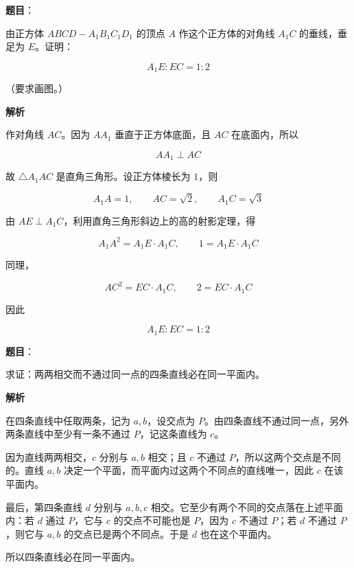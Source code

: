 \begin{answer}

\textbf{题目}：

由正方体 $ABCD-A_1B_1C_1D_1$ 的顶点 $A$ 作这个正方体的对角线 $A_1C$ 的垂线，垂足为 $E$。证明：

\nopagebreak[4]
\[
A_1E:EC=1:2
\]

（要求画图。）

\textbf{解析}
\nopagebreak[4]
\begin{center}\end{center}
\nopagebreak[4]
作对角线 $AC$。因为 $AA_1$ 垂直于正方体底面，且 $AC$ 在底面内，所以

\nopagebreak[4]
\[
AA_1\perp AC
\]

故 $\triangle A_1AC$ 是直角三角形。设正方体棱长为 $1$，则

\nopagebreak[4]
\[
A_1A=1,
\qquad AC=\sqrt2,
\qquad A_1C=\sqrt3
\]

由 $AE\perp A_1C$，利用直角三角形斜边上的高的射影定理，得

\nopagebreak[4]
\[
A_1A^2=A_1E\cdot A_1C,
\qquad 1=A_1E\cdot A_1C
\]

同理，

\nopagebreak[4]
\[
AC^2=EC\cdot A_1C,
\qquad 2=EC\cdot A_1C
\]

因此

\nopagebreak[4]
\[
A_1E:EC=1:2
\]


\end{answer}
\begin{answer}

\textbf{题目}：

求证：两两相交而不通过同一点的四条直线必在同一平面内。

\textbf{解析}

在四条直线中任取两条，记为 $a,b$，设交点为 $P$。由四条直线不通过同一点，另外两条直线中至少有一条不通过 $P$，记这条直线为 $c$。

因为直线两两相交，$c$ 分别与 $a,b$ 相交；且 $c$ 不通过 $P$，所以这两个交点是不同的。直线 $a,b$ 决定一个平面，而平面内过这两个不同点的直线唯一，因此 $c$ 在该平面内。

最后，第四条直线 $d$ 分别与 $a,b,c$ 相交。它至少有两个不同的交点落在上述平面内：若 $d$ 通过 $P$，它与 $c$ 的交点不可能也是 $P$，因为 $c$ 不通过 $P$；若 $d$ 不通过 $P$，则它与 $a,b$ 的交点已是两个不同点。于是 $d$ 也在这个平面内。

所以四条直线必在同一平面内。


\end{answer}